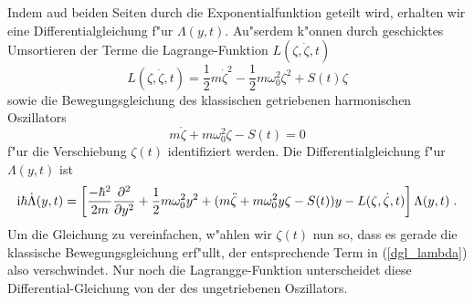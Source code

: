     \newpage

    Indem aud beiden Seiten durch die Exponentialfunktion geteilt wird, erhalten wir eine Differentialgleichung f"ur $\Lambda(y,t)$.
    Au"serdem k"onnen durch geschicktes Umsortieren der Terme die Lagrange-Funktion $L(\zeta,\dot \zeta, t)$
    \begin{equation}
      L(\zeta,\dot \zeta, t) = \frac{1}{2}m\dot \zeta^2 - \frac{1}{2}m\omega_0^2\zeta^2 + S(t)\zeta
      \label{lagrange_zeta}
    \end{equation}
      sowie die Bewegungsgleichung des klassischen getriebenen harmonischen  Oszillators \cite{husimi}
      \begin{equation}
        m\ddot \zeta + m\omega_0^2\zeta - S(t) = 0
        \label{dgl_zeta}
      \end{equation}
    f"ur die Verschiebung $\zeta(t)$ identifiziert werden.
    Die Differentialgleichung f"ur $\Lambda(y,t)$ ist
    \begin{equation}
      \text i \hbar \dot \Lambda(y,t) = \left[ \frac{-\hbar^2}{2m}\frac{\partial^2}{\partial y^2} + \frac{1}{2}m\omega_0^2y^2 + (m\ddot \zeta + m\omega_0^2y\zeta - S(t))y - L(\zeta,\dot \zeta, t) \right]\Lambda(y,t) \; .
      \label{dgl_lambda}
    \end{equation}
    Um die Gleichung zu vereinfachen, w"ahlen wir $\zeta(t)$ nun so, dass es gerade die klassische Bewegungsgleichung erf"ullt, der entsprechende Term in (\ref{dgl_lambda}) also verschwindet.
    Nur noch die Lagrangge-Funktion unterscheidet diese Differential-Gleichung von der des ungetriebenen Oszillators.

